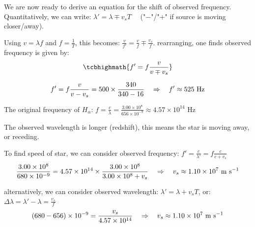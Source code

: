 We are now ready to derive an equation for the shift of observed frequency. 
Quantitatively, we can write: $\lambda' = \lambda \mp v_s T \quad$ ("$-$"/"$+$" if source is moving closer/away).


Using $v = \lambda f$ and $f=\frac{1}{T}$, this becomes: $ \frac{v}{f'} = \frac{v}{f} \mp \frac{v_s}{f} $.
rearranging, one finds observed frequency is given by: $$\tcbhighmath{f' = f\frac{v}{v \mp v_s}}$$


\begin{soln}
\begin{equation*}
	f' = f\frac{v}{v - v_s} = 500 \times \frac{340}{340-16} \quad \Rightarrow \quad f' \approx 525 \text{ Hz} 
\end{equation*}
    
\end{soln}

    


\begin{soln}
The original frequency of $H_\alpha$: $f = \frac{c}{\lambda} = \frac{3.00\times10^8}{656 \times 10^{-9}} \approx 4.57 \times 10^{14} \text{ Hz}$

The observed wavelength is longer (redshift), this means the star is moving away, or receding.

To find speed of star, we can consider observed frequency: $f' = \frac{c}{\lambda'} = f\frac{c}{c + v_s}$
\begin{equation*}
	\frac{3.00\times10^8}{680\times10^{-9}} = 4.57 \times 10^{14} \times \frac{3.00\times10^8}{3.00\times10^8 + v_s} \quad \Rightarrow \quad v_s \approx 1.10 \times 10^7 \text{ m s$^{-1}$}
\end{equation*}

alternatively, we can consider observed wavelength: $\lambda' = \lambda + v_s T$, or: $\Delta \lambda = \lambda' - \lambda = \frac{v_s}{f}$
\begin{equation*}
	(680-656)\times10^{-9} = \frac{v_s}{4.57 \times 10^{14}} \quad \Rightarrow \quad  v_s \approx 1.10 \times 10^7 \text{ m s$^{-1}$} 
\end{equation*}
\end{soln}


